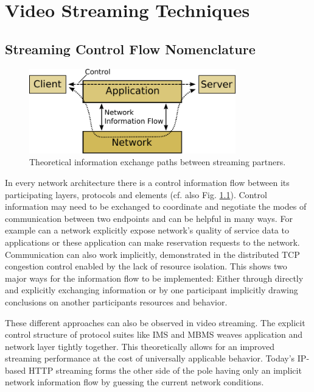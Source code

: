 \chapter{Video Streaming Techniques}
\label{chap:streaming}


\section{Streaming Control Flow Nomenclature}


\begin{figure}[htbp]
\centering
\includegraphics[width=0.8\textwidth]{images/nif.pdf}
\caption{Theoretical information exchange paths between streaming partners.}
\label{c3:fig:nif}
\end{figure}

In every network architecture there is a control information flow between its participating layers, protocols and elements (cf. also Fig. \ref{c3:fig:nif}). Control information may need to be exchanged to coordinate and negotiate the modes of communication between two endpoints and can be helpful in many ways. For example can a network explicitly expose network's quality of service data to applications or these application can make reservation requests to the network. Communication can also work implicitly, demonstrated in the distributed TCP congestion control enabled by the lack of resource isolation. This shows two major ways for the information flow to be implemented: Either through directly and explicitly exchanging information or by one participant implicitly drawing conclusions on another participants resources and behavior.

These different approaches can also be observed in video streaming. The explicit control structure of protocol suites like IMS\cite{3gpp23228} and MBMS weaves application and network layer tightly together. This theoretically allows for an improved streaming performance at the cost of universally applicable behavior. Today's IP-based HTTP streaming forms the other side of the pole having only an implicit network information flow by guessing the current network conditions.

